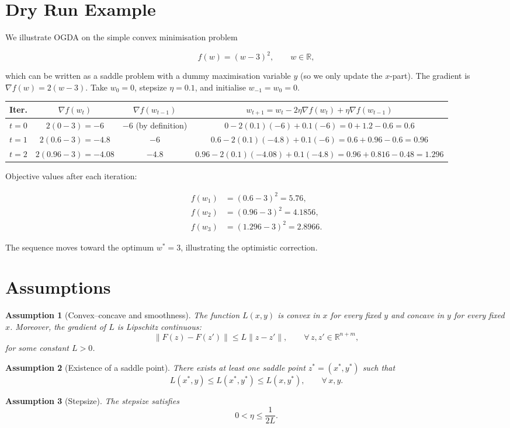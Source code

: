 \documentclass{article}
\newtheorem{assumption}{Assumption}
\newcommand{\R}{\mathbb{R}}
\begin{document}
\section*{Dry Run Example}
We illustrate OGDA on the simple convex minimisation problem  

\[
f(w)=(w-3)^{2},\qquad w\in\R,
\]

which can be written as a saddle problem with a dummy maximisation variable \(y\) (so we only update the \(x\)-part).  
The gradient is \(\nabla f(w)=2(w-3)\).  
Take \(w_{0}=0\), stepsize \(\eta=0.1\), and initialise \(w_{-1}=w_{0}=0\).

\begin{center}
\begin{tabular}{c|c|c|c}
\textbf{Iter.} & \(\nabla f(w_{t})\) & \(\nabla f(w_{t-1})\) & \(w_{t+1}=w_{t}-2\eta\nabla f(w_{t})+\eta\nabla f(w_{t-1})\)\\\hline
\(t=0\) & \(2(0-3)=-6\) & \(-6\) (by definition) &
\(0-2(0.1)(-6)+0.1(-6)=0+1.2-0.6=0.6\)\\[2mm]
\(t=1\) & \(2(0.6-3)=-4.8\) & \(-6\) &
\(0.6-2(0.1)(-4.8)+0.1(-6)=0.6+0.96-0.6=0.96\)\\[2mm]
\(t=2\) & \(2(0.96-3)=-4.08\) & \(-4.8\) &
\(0.96-2(0.1)(-4.08)+0.1(-4.8)=0.96+0.816-0.48=1.296\)
\end{tabular}
\end{center}

Objective values after each iteration:

\[
\begin{aligned}
f(w_{1})&=(0.6-3)^{2}=5.76,\\
f(w_{2})&=(0.96-3)^{2}=4.1856,\\
f(w_{3})&=(1.296-3)^{2}=2.8966.
\end{aligned}
\]

The sequence moves toward the optimum \(w^{*}=3\), illustrating the optimistic correction.

\newpage
\section*{Assumptions}
\begin{assumption}[Convex–concave and smoothness]\label{as:convex}
The function \(L(x,y)\) is convex in \(x\) for every fixed \(y\) and concave in \(y\) for every fixed \(x\). Moreover, the gradient of \(L\) is Lipschitz continuous:
\[
\|F(z)-F(z')\|\le L\|z-z'\|,\qquad\forall\,z,z'\in\R^{n+m},
\]
for some constant \(L>0\).
\end{assumption}
\begin{assumption}[Existence of a saddle point]\label{as:saddle}
There exists at least one saddle point \(z^{*}=(x^{*},y^{*})\) such that
\[
L(x^{*},y)\le L(x^{*},y^{*})\le L(x,y^{*}),\qquad\forall\,x,y.
\]
\end{assumption}
\begin{assumption}[Stepsize]\label{as:stepsize}
The stepsize satisfies 
\[
0<\eta\le \frac{1}{2L}.
\]
\end{assumption}
\end{document}
